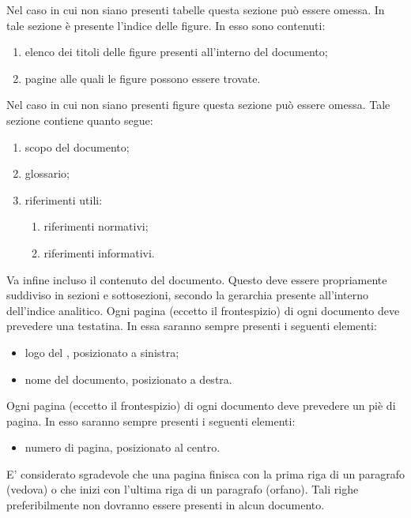 					Nel caso in cui non siano presenti tabelle questa sezione può essere omessa.
					In tale sezione è presente l’indice delle figure. In esso sono contenuti:
					\begin{enumerate}
						\item elenco dei titoli delle figure presenti all’interno del documento;
						\item pagine alle quali le figure possono essere trovate.
					\end{enumerate}
					Nel caso in cui non siano presenti figure questa sezione può essere omessa.
					Tale sezione contiene quanto segue:
					\begin{enumerate}
						\item scopo del documento;
						\item glossario;
						\item riferimenti utili:
						\begin{enumerate}
							\item riferimenti normativi;
							\item riferimenti informativi.
						\end{enumerate}
					\end{enumerate}
					Va infine incluso il contenuto del documento. Questo deve essere propriamente suddiviso in sezioni e sottosezioni, secondo la gerarchia presente all’interno dell’indice analitico.
						Ogni pagina (eccetto il frontespizio) di ogni documento deve prevedere una testatina. In essa saranno sempre presenti i seguenti elementi:
						\begin{itemize}
							\item logo del , posizionato a sinistra;
							\item nome del documento, posizionato a destra.
						\end{itemize}
						Ogni pagina (eccetto il frontespizio) di ogni documento deve prevedere un piè di pagina. In esso saranno sempre presenti i seguenti elementi:
						\begin{itemize}
							\item numero di pagina, posizionato al centro.
						\end{itemize}
						E’ considerato sgradevole che una pagina finisca con la prima riga di un paragrafo (vedova) o che inizi con l’ultima riga di un paragrafo (orfano). Tali righe preferibilmente non dovranno essere presenti in alcun documento.
